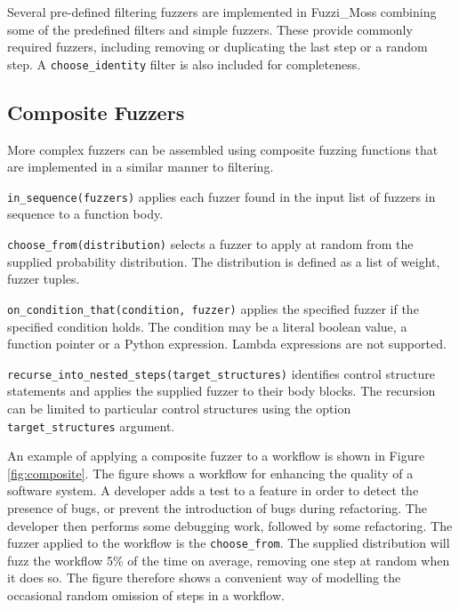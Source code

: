 \documentclass{sig-alternate}
\newenvironment{FunctionList}{%
\lstset{basicstyle=\ttfamily\bfseries\small}
\begin{list}{}{\leftmargin=5pt}
}{\end{list}\lstset{basicstyle=\ttfamily\small}}
\begin{document}
Several pre-defined filtering fuzzers are implemented in Fuzzi\_Moss combining
some of the predefined filters and simple fuzzers.  These provide commonly
required fuzzers, including removing or duplicating the last step or a random
step. A \lstinline!choose_identity! filter is also included for completeness.


\subsection{Composite Fuzzers}


More complex fuzzers can be assembled using composite fuzzing functions that are
implemented in a similar manner to filtering.  


\begin{FunctionList}
\item \lstinline!in_sequence(fuzzers)! applies each fuzzer found in the input
  list of fuzzers in sequence to a function body.

\item \lstinline!choose_from(distribution)! selects a fuzzer to apply at random
  from the supplied probability distribution.  The distribution is defined as a
  list of weight, fuzzer tuples.

\item \lstinline!on_condition_that(condition, fuzzer)! %
  applies the specified fuzzer if the specified condition holds.  The condition
  may be a literal boolean value, a function pointer or a Python expression.
  Lambda expressions are not supported.

\item \lstinline!recurse_into_nested_steps(target_structures)! identifies
  control structure statements and applies the supplied fuzzer to their body
  blocks.  The recursion can be limited to particular control structures using
  the option \lstinline!target_structures! argument.
\end{FunctionList}

An example of applying a composite fuzzer to a workflow is shown in Figure
\ref{fig:composite}.  The figure shows a workflow for enhancing the quality of a
software system.  A developer adds a test to a feature in order to detect the
presence of bugs, or prevent the introduction of bugs during refactoring.  The
developer then performs some debugging work, followed by some refactoring.  The
fuzzer applied to the workflow is the \lstinline!choose_from!.  The supplied
distribution will fuzz the workflow 5\% of the time on average, removing one
step at random when it does so.  The figure therefore shows a convenient way of
modelling the occasional random omission of steps in a workflow.
\end{document}
